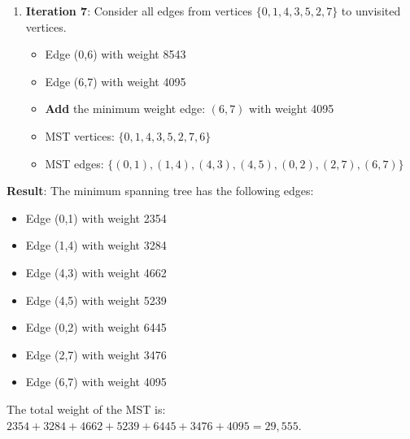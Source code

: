 \documentclass{article}
\theoremstyle{definition}
\begin{document}
\begin{enumerate}
\item \textbf{Iteration 7}: Consider all edges from vertices $\{0,1,4,3,5,2,7\}$ to unvisited vertices.
   \begin{itemize}
   \item Edge (0,6) with weight 8543
   \item Edge (6,7) with weight 4095
   \item \textbf{Add} the minimum weight edge: $(6,7)$ with weight 4095
   \item MST vertices: $\{0,1,4,3,5,2,7,6\}$
   \item MST edges: $\{(0,1), (1,4), (4,3), (4,5), (0,2), (2,7), (6,7)\}$
   \end{itemize}
\end{enumerate}

\noindent\textbf{Result}: The minimum spanning tree has the following edges:
\begin{itemize}
\item Edge (0,1) with weight 2354
\item Edge (1,4) with weight 3284
\item Edge (4,3) with weight 4662
\item Edge (4,5) with weight 5239
\item Edge (0,2) with weight 6445
\item Edge (2,7) with weight 3476
\item Edge (6,7) with weight 4095
\end{itemize}

\noindent The total weight of the MST is: $2354 + 3284 + 4662 + 5239 + 6445 + 3476 + 4095 = 29,555$.
\end{document}
